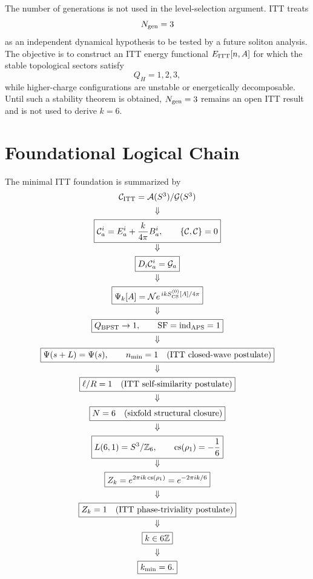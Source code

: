 \documentclass[11pt,a4paper]{article}
\begin{document}
The number of generations is not used in the level-selection argument. ITT treats
\begin{equation}
N_{\rm gen}=3
\end{equation}
as an independent dynamical hypothesis to be tested by a future soliton analysis.
The objective is to construct an ITT energy functional $E_{\rm ITT}[n,A]$ for which the stable topological sectors satisfy
\begin{equation}
Q_H=1,2,3,
\end{equation}
while higher-charge configurations are unstable or energetically decomposable. Until such a stability theorem is obtained, $N_{\rm gen}=3$ remains an open ITT result and is not used to derive $k=6$.

\section{Foundational Logical Chain}

The minimal ITT foundation is summarized by
\begin{equation}
\begin{array}{c}
\mathcal C_{\rm ITT}=\mathcal A(S^3)/\mathcal G(S^3)\\[4pt]
\Downarrow\\[4pt]
\boxed{\mathcal C_a^i=E_a^i+\frac{k}{4\pi}B_a^i,\qquad \{\mathcal C,\mathcal C\}=0}\\[4pt]
\Downarrow\\[4pt]
\boxed{D_i\mathcal C_a^i=\mathcal G_a}\\[4pt]
\Downarrow\\[4pt]
\boxed{\Psi_k[A]=\mathcal N e^{\,ikS_{\rm CS}^{(0)}[A]/4\pi} }\\[4pt]
\Downarrow\\[4pt]
\boxed{Q_{\rm BPST}\to1,\qquad \mathrm{SF}=\mathrm{ind}_{\rm APS}=1}\\[4pt]
\Downarrow\\[4pt]
\boxed{\Psi(s+L)=\Psi(s),\qquad n_{\min}=1\quad\text{(ITT closed-wave postulate)}}\\[4pt]
\Downarrow\\[4pt]
\boxed{\ell/R=1\quad\text{(ITT self-similarity postulate)}}\\[4pt]
\Downarrow\\[4pt]
\boxed{N=6\quad\text{(sixfold structural closure)}}\\[4pt]
\Downarrow\\[4pt]
\boxed{L(6,1)=S^3/\mathbb Z_6,\qquad \mathrm{cs}(\rho_1)=-\frac16}\\[4pt]
\Downarrow\\[4pt]
\boxed{Z_k=e^{2\pi i k\,\mathrm{cs}(\rho_1)}=e^{-2\pi i k/6}}\\[4pt]
\Downarrow\\[4pt]
\boxed{Z_k=1\quad\text{(ITT phase-triviality postulate)}}\\[4pt]
\Downarrow\\[4pt]
\boxed{k\in6\mathbb Z}\\[4pt]
\Downarrow\\[4pt]
\boxed{k_{\min}=6.}
\end{array}
\end{equation}
\end{document}

